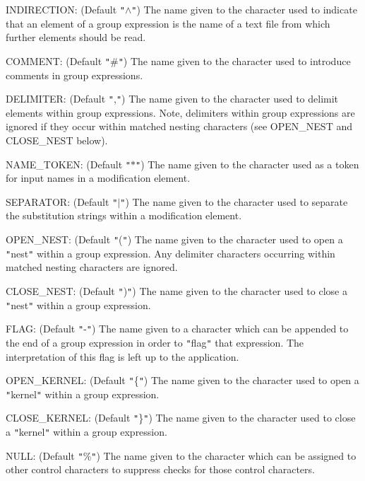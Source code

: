 {{{         \sstitem
         INDIRECTION: (Default {\tt "}$\wedge${\tt "}) The name given to the character used
         to indicate that an element of a group expression is the name of a
         text file from which further elements should be read.

         \sstitem
         COMMENT: (Default {\tt "}\#{\tt "}) The name given to the character used to
         introduce comments in group expressions.

         \sstitem
         DELIMITER: (Default {\tt "},{\tt "}) The name given to the character used
         to delimit elements within group expressions. Note, delimiters
         within group expressions are ignored if they occur within matched
         nesting characters (see OPEN\_NEST and CLOSE\_NEST below).

         \sstitem
         NAME\_TOKEN: (Default {\tt "}$*${\tt "}) The name given to the character used
         as a token for input names in a modification element.

         \sstitem
         SEPARATOR: (Default {\tt "}$|${\tt "}) The name given to the character used
         to separate the substitution strings within a modification
         element.

         \sstitem
         OPEN\_NEST: (Default {\tt "}({\tt "}) The name given to the character used
         to open a {\tt "}nest{\tt "} within a group expression. Any delimiter
         characters occurring within matched nesting characters are ignored.

         \sstitem
         CLOSE\_NEST: (Default {\tt "}){\tt "}) The name given to the character used
         to close a {\tt "}nest{\tt "} within a group expression.

         \sstitem
         FLAG: (Default {\tt "}-{\tt "}) The name given to a character which can
         be appended to the end of a group expression in order to
         {\tt "}flag{\tt "} that expression. The interpretation of this flag is left
         up to the application.

         \sstitem
         OPEN\_KERNEL: (Default {\tt "}\{{\tt "}) The name given to the character used
         to open a {\tt "}kernel{\tt "} within a group expression.

         \sstitem
         CLOSE\_KERNEL: (Default {\tt "}\}{\tt "}) The name given to the character used
         to close a {\tt "}kernel{\tt "} within a group expression.

         \sstitem
         NULL: (Default {\tt "}\%{\tt "}) The name given to the character which can
         be assigned to other control characters to suppress checks for
         those control characters.
      }
   }
}

